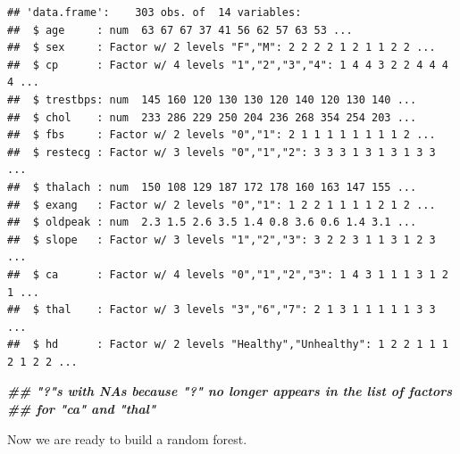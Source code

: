 \documentclass[
]{book}
\newenvironment{Shaded}{\begin{snugshade}}{\end{snugshade}}
\newcommand{\AttributeTok}[1]{\textcolor[rgb]{0.77,0.63,0.00}{#1}}
\newcommand{\CommentTok}[1]{\textcolor[rgb]{0.56,0.35,0.01}{\textit{#1}}}
\newcommand{\DecValTok}[1]{\textcolor[rgb]{0.00,0.00,0.81}{#1}}
\newcommand{\DocumentationTok}[1]{\textcolor[rgb]{0.56,0.35,0.01}{\textbf{\textit{#1}}}}
\newcommand{\FunctionTok}[1]{\textcolor[rgb]{0.00,0.00,0.00}{#1}}
\newcommand{\NormalTok}[1]{#1}
\newcommand{\OtherTok}[1]{\textcolor[rgb]{0.56,0.35,0.01}{#1}}
\newcommand{\SpecialCharTok}[1]{\textcolor[rgb]{0.00,0.00,0.00}{#1}}
\newcommand{\StringTok}[1]{\textcolor[rgb]{0.31,0.60,0.02}{#1}}
\begin{document}
\begin{Shaded}
\end{Shaded}

\begin{verbatim}
## 'data.frame':    303 obs. of  14 variables:
##  $ age     : num  63 67 67 37 41 56 62 57 63 53 ...
##  $ sex     : Factor w/ 2 levels "F","M": 2 2 2 2 1 2 1 1 2 2 ...
##  $ cp      : Factor w/ 4 levels "1","2","3","4": 1 4 4 3 2 2 4 4 4 4 ...
##  $ trestbps: num  145 160 120 130 130 120 140 120 130 140 ...
##  $ chol    : num  233 286 229 250 204 236 268 354 254 203 ...
##  $ fbs     : Factor w/ 2 levels "0","1": 2 1 1 1 1 1 1 1 1 2 ...
##  $ restecg : Factor w/ 3 levels "0","1","2": 3 3 3 1 3 1 3 1 3 3 ...
##  $ thalach : num  150 108 129 187 172 178 160 163 147 155 ...
##  $ exang   : Factor w/ 2 levels "0","1": 1 2 2 1 1 1 1 2 1 2 ...
##  $ oldpeak : num  2.3 1.5 2.6 3.5 1.4 0.8 3.6 0.6 1.4 3.1 ...
##  $ slope   : Factor w/ 3 levels "1","2","3": 3 2 2 3 1 1 3 1 2 3 ...
##  $ ca      : Factor w/ 4 levels "0","1","2","3": 1 4 3 1 1 1 3 1 2 1 ...
##  $ thal    : Factor w/ 3 levels "3","6","7": 2 1 3 1 1 1 1 1 3 3 ...
##  $ hd      : Factor w/ 2 levels "Healthy","Unhealthy": 1 2 2 1 1 1 2 1 2 2 ...
\end{verbatim}

\begin{Shaded}
\begin{Highlighting}[]
  \DocumentationTok{\#\# "?"s with NAs because "?" no longer appears in the list of factors}
  \DocumentationTok{\#\# for "ca" and "thal"}
\end{Highlighting}
\end{Shaded}

Now we are ready to build a random forest.
\end{document}
